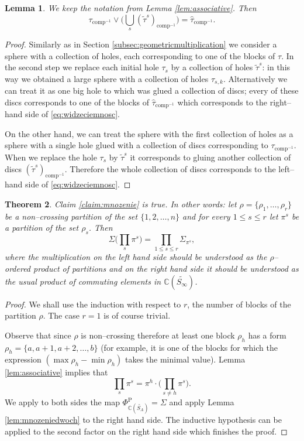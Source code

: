 \documentclass[12pt,dvips]{amsart}
\numberwithin{equation}{section} \numberwithin{figure}{section}
\theoremstyle{plain}
\newtheorem{lemma}{Lemma}[section]
\newtheorem{theorem}[lemma]{Theorem}
\theoremstyle{definition}
\theoremstyle{remark}
\newcommand{\C}{{\mathbb{C}}}
\newcommand{\Sn}[1]{{{S}}_{#1}}
\newcommand{\fpps}{\Phi^{\pp}_{\C(\PartPerm{A})}}
\newcommand{\PartPerm}[1]{\widetilde{\Sn{#1}}}
\DeclareMathOperator{\comp}{comp}
\DeclareMathOperator{\pp}{P}
\begin{document}
\begin{lemma}
\label{lem:babel} We keep the notation from Lemma
\ref{lem:associative}. Then
\begin{equation}
\tau_{\comp^{-1}}\vee\Big(\bigcup_s
(\tilde{\tau}^s)_{\comp^{-1}}\Big)=\hat{\tau}_{\comp^{-1}}.
\label{eq:widzeciemnosc}
\end{equation}
\end{lemma}
\begin{proof}
Similarly as in Section \ref{subsec:geometricmultiplication} we
consider a sphere with a collection of holes, each corresponding to
one of the blocks of $\tau$. In the second step we replace each
initial hole $\tau_s$ by a collection of holes $\tilde{\tau}^s$: in
this way we obtained a large sphere with a collection of holes
$\tau_{s,k}$.  Alternatively we can treat it as one big hole to
which was glued a collection of discs; every of these discs
corresponds to one of the blocks of $\hat{\tau}_{\comp^{-1}}$ which
corresponds to the right--hand side of \eqref{eq:widzeciemnosc}.

On the other hand, we can treat the sphere with the first collection
of holes as a sphere with a single hole glued with a collection of
discs corresponding to $\tau_{\comp^{-1}}$. When we replace the hole
$\tau_s$ by $\tilde{\tau}^s$ it corresponds to gluing another
collection of discs $(\tilde{\tau}^s)_{\comp^{-1}}$. Therefore the
whole collection of discs corresponds to the left--hand side of
\eqref{eq:widzeciemnosc}.
\end{proof}

\begin{theorem}
\label{theo:sigmajesthomomorfizmem} Claim \ref{claim:mnozenie} is
true. In other words: let $\rho=\{\rho_1,\dots,\rho_r\}$ be a
non--crossing partition of the set $\{1,2,\dots,n\}$ and for every
$1\leq s\leq r$ let $\pi^s$ be a partition of the set $\rho_s$. Then
$$\Sigma\Big( \prod_{s} \pi^s \Big)=\prod_{1\leq s\leq r} \Sigma_{\pi^s},$$
where the multiplication on the left hand side should be understood
as the $\rho$--ordered product of partitions and on the right hand
side it should be understood as the usual product of commuting
elements in $\C(\PartPerm{\infty})$.
\end{theorem}
\begin{proof}
We shall use the induction with respect to $r$, the number of blocks
of the partition $\rho$. The case $r=1$ is of course trivial.

Observe that since $\rho$ is non--crossing therefore at least one
block $\rho_h$ has a form $\rho_h=\{a,a+1,a+2,\dots,b\}$ (for
example, it is one of the blocks for which the expression $(\max
\rho_h- \min \rho_h)$ takes the minimal value).
Lemma \ref{lem:associative} implies that
$$\prod_s \pi^s = \pi^h \cdot \big( \prod_{s\neq h} \pi^s \big). $$
We apply to both sides the map $\fpps=\Sigma$ and apply Lemma
\ref{lem:mnozeniedwoch} to the right hand side. The inductive
hypothesis can be applied to the second factor on the right hand
side which finishes the proof.
\end{proof}
\end{document}
